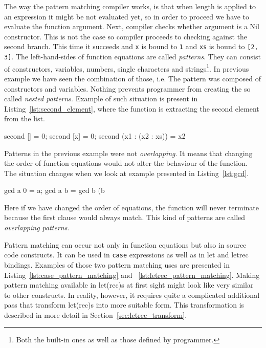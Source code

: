 \documentclass[12pt,a4paper]{report}
\begin{document}
The way the pattern matching compiler works, is that when length is applied to
an expression it might be not evaluated yet, so in order to proceed we have to
evaluate the function argument. Next, compiler checks whether argument is a Nil
constructor. This is not the case so compiler proceeds to checking against the
second branch. This time it succeeds and \texttt{x} is bound to \texttt{1} and
\texttt{xs} is bound to \texttt{[2, 3]}. The left-hand-sides of function
equations are called \textit{patterns}. They can consist of constructors,
variables, numbers, single characters and strings\footnote{Both the built-in
ones as well as those defined by programmer.}. In previous example we have seen
the combination of those, i.e. The pattern was composed of constructors and
variables. Nothing prevents programmer from creating the so called
\textit{nested patterns}. Example of such situation is present in
Listing~\ref{lst:second_element}, where the function is extracting the second
element from the list.

\vspace*{0.2in}
\begin{code}[style=haskell,label=lst:second_element,caption={Greatest common divisor.}]
second [] = 0;
second [x] = 0;
second (x1 : (x2 : xs)) = x2
\end{code}

Patterns in the previous example were not \textit{overlapping}. It
means that changing the order of function equations would not alter the
behaviour of the function. The situation changes when we look at example
presented in Listing~\ref{lst:gcd}.

\vspace*{0.2in}
\begin{code}[style=haskell,label=lst:gcd,caption={Greatest common divisor.}]
gcd a 0 = a;
gcd a b = gcd b (b %
\end{code}

Here if we have changed the order of equations, the function will never terminate
because the first clause would always match. This kind of patterns are called
\textit{overlapping patterns}.

Pattern matching can occur not only in function equations but also in source
code constructs. It can be used in \texttt{case} expressions as well as in
let and letrec bindings. Examples of those two pattern
matching uses are presented in Listing~\ref{lst:case_pattern_matching} and
~\ref{lst:letrec_pattern_matching}.  Making pattern matching available in
let(rec)s at first sight might look like very similar to other constructs. In
reality, however, it requires quite a complicated additional pass that
transform let(rec)s into more suitable form.  This transformation is described
in more detail in Section~\ref{sec:letrec_transform}.
\end{document}
